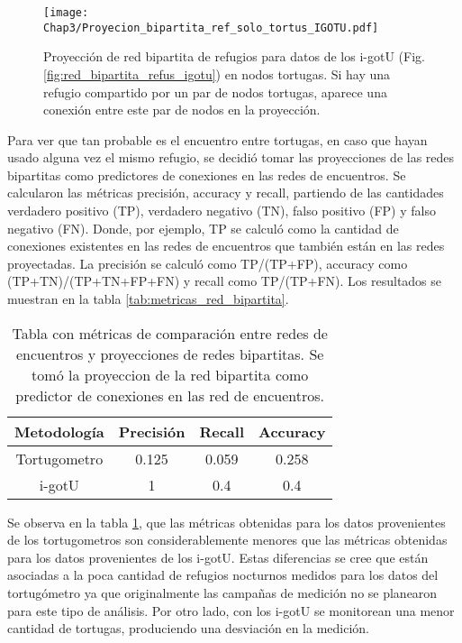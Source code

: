 \begin{figure}[ht]
    \begin{center}
        \texttt{[image: Chap3/Proyecion\_bipartita\_ref\_solo\_tortus\_IGOTU.pdf]}
        \caption[Proyección  de red bipartita de refugios para datos de los tortugometros en nodos tortugas.]{Proyección  de red bipartita de refugios para datos de los i-gotU (Fig. \ref{fig:red_bipartita_refus_igotu}) en nodos tortugas. Si hay una refugio compartido por un par de nodos tortugas, aparece una conexión entre este par de nodos en la proyección. }
        \label{fig:proyeccion_red_igotu}
       
        \end{center}
\end{figure}
Para  ver que tan probable es el encuentro entre tortugas, en caso que hayan usado alguna vez el mismo refugio, se decidió tomar las proyecciones de las redes bipartitas como predictores de conexiones en las redes de encuentros. Se calcularon las métricas precisión, accuracy y recall, partiendo de las cantidades verdadero positivo (TP), verdadero negativo (TN), falso positivo (FP) y falso negativo (FN). Donde, por ejemplo, TP se calculó como la cantidad de conexiones existentes en las redes de encuentros que también están en las redes proyectadas. La precisión se calculó como TP/(TP+FP), accuracy como (TP+TN)/(TP+TN+FP+FN) y  recall como TP/(TP+FN). Los resultados se muestran en la tabla \ref{tab:metricas_red_bipartita}.

\begin{table}[ht]
    \centering
    \begin{tabular}{|c|c|c|c|}
       
   \hline
    Metodología  & Precisión & Recall & Accuracy \\ \hline
    Tortugometro & 0.125     & 0.059  & 0.258    \\ \hline
    i-gotU       & 1         & 0.4    & 0.4       \\ \hline
   
    \end{tabular}
    \caption[Tabla con métricas de comparación entre redes de encuentros y proyecciones de redes bipartitas.]{Tabla con métricas de comparación entre redes de encuentros y proyecciones de redes bipartitas. Se tomó la proyeccion de la red bipartita como predictor de conexiones en las red de encuentros.}
    \label{tab:metricas_comparacion_redes}
\end{table}

Se observa en la tabla \ref{tab:metricas_comparacion_redes}, que las métricas obtenidas para los datos provenientes de los tortugometros son considerablemente menores que las métricas obtenidas para los datos provenientes de los i-gotU. Estas diferencias se cree que están asociadas a la poca cantidad de refugios nocturnos medidos para los datos del tortugómetro ya que originalmente las campañas de medición no se planearon para este tipo de análisis. Por otro lado, con los i-gotU se monitorean una menor cantidad de tortugas, produciendo una desviación en la medición.
 
